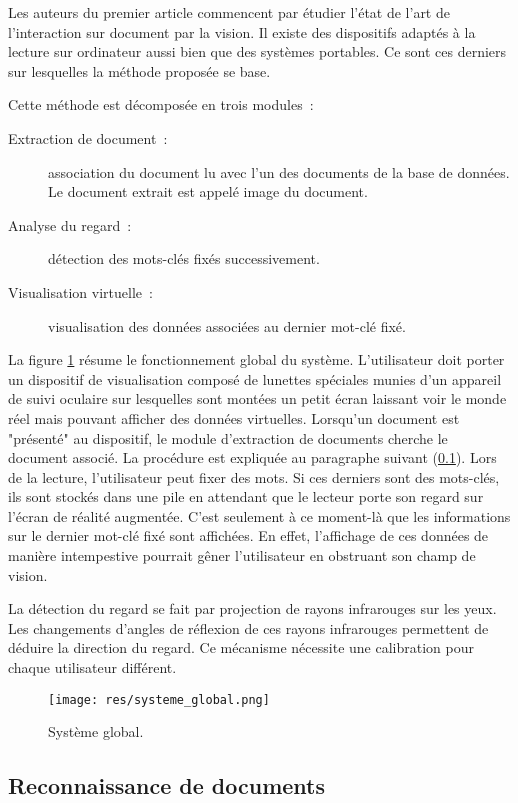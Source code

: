 \documentclass[a4paper]{article}
\begin{document}
Les auteurs du premier article commencent par étudier l'état de l'art de l'interaction sur document par la vision. Il existe des dispositifs adaptés à la lecture sur ordinateur aussi bien que des systèmes portables. Ce sont ces derniers sur lesquelles la méthode proposée se base.

Cette méthode est décomposée en trois modules~:
\begin{description}
	\item[Extraction de document~:] association du document lu avec l'un des documents de la base de données. Le document extrait est appelé image du document.
	\item[Analyse du regard~:] détection des mots-clés fixés successivement.
	\item[Visualisation virtuelle~:] visualisation des données associées au dernier mot-clé fixé.
\end{description}

La figure \ref{fig:system} résume le fonctionnement global du système. L'utilisateur doit porter un dispositif de visualisation composé de lunettes spéciales munies d'un appareil de suivi oculaire sur lesquelles sont montées un petit écran laissant voir le monde réel mais pouvant afficher des données virtuelles. Lorsqu'un document est "présenté" au dispositif, le module d'extraction de documents cherche le document associé. La procédure est expliquée au paragraphe suivant (\ref{subsec:reconnaissance}). Lors de la lecture, l'utilisateur peut fixer des mots. Si ces derniers sont des mots-clés, ils sont stockés dans une pile en attendant que le lecteur porte son regard sur l'écran de réalité augmentée. C'est seulement à ce moment-là que les informations sur le dernier mot-clé fixé sont affichées. En effet, l'affichage de ces données de manière intempestive pourrait gêner l'utilisateur en obstruant son champ de vision.

La détection du regard se fait par projection de rayons infrarouges sur les yeux. Les changements d'angles de réflexion de ces rayons infrarouges permettent de déduire la direction du regard. Ce mécanisme nécessite une calibration pour chaque utilisateur différent.

\begin{figure}[!h]
\centering
\texttt{[image: res/systeme\_global.png]}
\caption{\label{fig:system}Système global.}
\end{figure}

\subsection{Reconnaissance de documents}
\label{subsec:reconnaissance}
\end{document}
